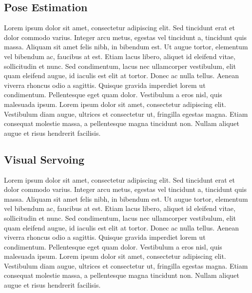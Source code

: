 \documentclass[letterpaper, 10 pt, conference]{ieeeconf}
\begin{document}
\subsection{Pose Estimation}
Lorem ipsum dolor sit amet, consectetur adipiscing elit. Sed tincidunt erat et dolor commodo varius. Integer arcu metus, egestas vel tincidunt a, tincidunt quis massa. Aliquam sit amet felis nibh, in bibendum est. Ut augue tortor, elementum vel bibendum ac, faucibus at est. Etiam lacus libero, aliquet id eleifend vitae, sollicitudin et nunc. Sed condimentum, lacus nec ullamcorper vestibulum, elit quam eleifend augue, id iaculis est elit at tortor. Donec ac nulla tellus. Aenean viverra rhoncus odio a sagittis. Quisque gravida imperdiet lorem ut condimentum. Pellentesque eget quam dolor. Vestibulum a eros nisl, quis malesuada ipsum. Lorem ipsum dolor sit amet, consectetur adipiscing elit. Vestibulum diam augue, ultrices et consectetur ut, fringilla egestas magna. Etiam consequat molestie massa, a pellentesque magna tincidunt non. Nullam aliquet augue et risus hendrerit facilisis.

\subsection{Visual Servoing}
Lorem ipsum dolor sit amet, consectetur adipiscing elit. Sed tincidunt erat et dolor commodo varius. Integer arcu metus, egestas vel tincidunt a, tincidunt quis massa. Aliquam sit amet felis nibh, in bibendum est. Ut augue tortor, elementum vel bibendum ac, faucibus at est. Etiam lacus libero, aliquet id eleifend vitae, sollicitudin et nunc. Sed condimentum, lacus nec ullamcorper vestibulum, elit quam eleifend augue, id iaculis est elit at tortor. Donec ac nulla tellus. Aenean viverra rhoncus odio a sagittis. Quisque gravida imperdiet lorem ut condimentum. Pellentesque eget quam dolor. Vestibulum a eros nisl, quis malesuada ipsum. Lorem ipsum dolor sit amet, consectetur adipiscing elit. Vestibulum diam augue, ultrices et consectetur ut, fringilla egestas magna. Etiam consequat molestie massa, a pellentesque magna tincidunt non. Nullam aliquet augue et risus hendrerit facilisis.


\end{document}
